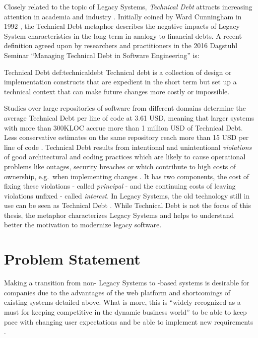 Closely related to the topic of \glspl{Legacy System}, \emph{\gls{Technical Debt}} attracts increasing attention in academia and industry \autocite{Li2015TDSMS,Yli-Huumo2016TD}.
Initially coined by Ward Cunningham in 1992 \autocite{Cunningham1992TD}, the \gls{Technical Debt} metaphor describes the negative impacts of \gls{Legacy System} characteristics in the long term in analogy to financial debts.
A recent definition agreed upon by researchers and practitioners in the 2016 Dagstuhl Seminar ``Managing Technical Debt in Software Engineering'' is:

\begin{thesisdefinition}{Technical Debt \autocite{Avgeriou2016TD}}{def:technicaldebt}
Technical debt is a collection of design or implementation constructs that are expedient in the short term but set up a technical context that can make future changes more costly or impossible.
\end{thesisdefinition}

Studies over large repositories of software from different domains determine the average \gls{Technical Debt} per line of code at 3.61 USD, meaning that larger systems with more than 300KLOC accrue more than 1 million USD of \gls{Technical Debt}.
\autocite{CAST2011} Less conservative estimates on the same repository reach more than 15 USD per line of code \autocite{Curtis2012EstimatingTD}.
\gls{Technical Debt} results from intentional and unintentional \emph{violations} of good architectural and coding practices which are likely to cause operational problems like outages, security breaches or which contribute to high costs of ownership, e.g.~when implementing changes \autocite{Curtis2012EstimatingTD}.
It has two components, the cost of fixing these violations - called \emph{principal} - and the continuing costs of leaving violations unfixed - called \emph{interest}.
In \glspl{Legacy System}, the old technology still in use can be seen as \gls{Technical Debt} \autocite{Yli-Huumo2016TD}.
While \gls{Technical Debt} is not the focus of this thesis, the metaphor characterizes \glspl{Legacy System} and helps to understand better the motivation to modernize legacy software.

\hypertarget{sec:problem}{%
\section{Problem Statement}\label{sec:problem}}

Making a transition from non- \glspl{Legacy System} to -based systems is desirable for companies due to the advantages of the \Gls{web} platform and shortcomings of existing systems detailed above.
What is more, this is ``widely recognized as a must for keeping competitive in the dynamic business world'' \autocite{Aversano2001} to be able to keep pace with changing user expectations and be able to implement new requirements \autocite{Fuhr2013SOAMIG,Lucia2008}.

